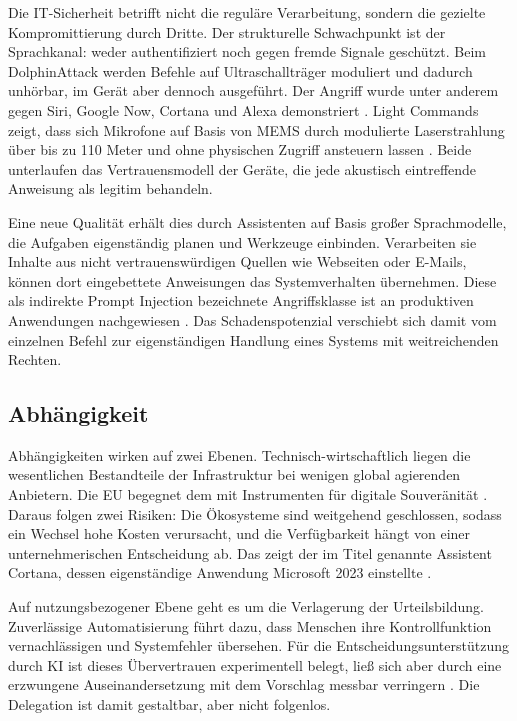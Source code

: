 Die IT-Sicherheit betrifft nicht die reguläre Verarbeitung, sondern die gezielte Kompromittierung durch Dritte. Der strukturelle Schwachpunkt ist der Sprachkanal: weder authentifiziert noch gegen fremde Signale geschützt. Beim DolphinAttack werden Befehle auf Ultraschallträger moduliert und dadurch unhörbar, im Gerät aber dennoch ausgeführt. Der Angriff wurde unter anderem gegen Siri, Google Now, Cortana und Alexa demonstriert \cite{zhang2017dolphin}. Light Commands zeigt, dass sich Mikrofone auf Basis von \ac{MEMS} durch modulierte Laserstrahlung über bis zu 110 Meter und ohne physischen Zugriff ansteuern lassen \cite{sugawara2020light}. Beide unterlaufen das Vertrauensmodell der Geräte, die jede akustisch eintreffende Anweisung als legitim behandeln.

Eine neue Qualität erhält dies durch Assistenten auf Basis großer Sprachmodelle, die Aufgaben eigenständig planen und Werkzeuge einbinden. Verarbeiten sie Inhalte aus nicht vertrauenswürdigen Quellen wie Webseiten oder E-Mails, können dort eingebettete Anweisungen das Systemverhalten übernehmen. Diese als indirekte Prompt Injection bezeichnete Angriffsklasse ist an produktiven Anwendungen nachgewiesen \cite{greshake2023injection}. Das Schadenspotenzial verschiebt sich damit vom einzelnen Befehl zur eigenständigen Handlung eines Systems mit weitreichenden Rechten.

\subsection{Abhängigkeit}
\label{subsec:abhaengigkeit}

Abhängigkeiten wirken auf zwei Ebenen. Technisch-wirtschaftlich liegen die wesentlichen Bestandteile der Infrastruktur bei wenigen global agierenden Anbietern. Die \ac{EU} begegnet dem mit Instrumenten für digitale Souveränität \cite{blancato2024cloud}. Daraus folgen zwei Risiken: Die Ökosysteme sind weitgehend geschlossen, sodass ein Wechsel hohe Kosten verursacht, und die Verfügbarkeit hängt von einer unternehmerischen Entscheidung ab. Das zeigt der im Titel genannte Assistent Cortana, dessen eigenständige Anwendung Microsoft 2023 einstellte \cite{microsoft2023cortana}.

Auf nutzungsbezogener Ebene geht es um die Verlagerung der Urteilsbildung. Zuverlässige Automatisierung führt dazu, dass Menschen ihre Kontrollfunktion vernachlässigen und Systemfehler übersehen. Für die Entscheidungsunterstützung durch \ac{KI} ist dieses Übervertrauen experimentell belegt, ließ sich aber durch eine erzwungene Auseinandersetzung mit dem Vorschlag messbar verringern \cite{bucinca2021trust}. Die Delegation ist damit gestaltbar, aber nicht folgenlos.

